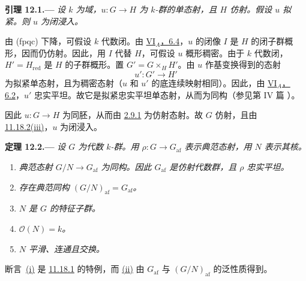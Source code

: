 \medskip
{}\label{lem:sga3-VIB-12.1}%
\noindent\textbf{引理 12.1.---}
\emph{设 \(k\) 为域，\(u:G\to H\) 为 \(k\)-群的单态射，且 \(H\) 仿射。假设 \(u\) 拟紧。则 \(u\) 为闭浸入。}

由 \textup{(fpqc)} 下降，可假设 \(k\) 代数闭。由 \hyperref[prop:sga3-VIA-6.4]{VI\(_A\)，6.4}，\(u\) 的闭像 \(I\) 是 \(H\) 的闭子群概形，因而仍仿射。因此，用 \(I\) 代替 \(H\)，可假设 \(u\) 概形稠密。由于 \(k\) 代数闭，\(H'=H_{\mathrm{red}}\) 是 \(H\) 的子群概形。置 \(G'=G\times_HH'\)。由 \(u\) 作基变换得到的态射
\[
  u':G'\longrightarrow H'
\]
为拟紧单态射，且为稠密态射\textup{（\(u\) 和 \(u'\) 的底连续映射相同）}。因此，由 \hyperref[cor:sga3-VIA-6.2]{VI\(_A\)，6.2}，\(u'\) 忠实平坦。故它是拟紧忠实平坦单态射，从而为同构\textup{（参见第 IV 篇 ）}。

因此 \(u:G\to H\) 为同胚，从而由 \hyperref[lem:sga3-VIB-2.9.1]{2.9.1} 为仿射态射。故 \(G\) 仿射，且由 \hyperref[thm:sga3-VIB-11.18.2]{11.18.2\textup{(iii)}}，\(u\) 为闭浸入。

\medskip
{}\label{thm:sga3-VIB-12.2}%
\noindent\textbf{定理 12.2.---}
\emph{设 \(G\) 为代数 \(k\)-群。用 \(\rho:G\to G_{\mathrm{af}}\) 表示典范态射，用 \(N\) 表示其核。}
\begin{enumerate}
\item[\textup{(i)}]\label{thm:sga3-VIB-12.2-i}%
  \emph{典范态射 \(G/N\to G_{\mathrm{af}}\) 为同构。因此 \(G_{\mathrm{af}}\) 是仿射代数群，且 \(\rho\) 忠实平坦。}

\item[\textup{(ii)}]\label{thm:sga3-VIB-12.2-ii}%
  \emph{存在典范同构 \((G/N)_{\mathrm{af}}=G_{\mathrm{af}}\)。}

\item[\textup{(iii)}]\label{thm:sga3-VIB-12.2-iii}%
  \emph{\(N\) 是 \(G\) 的特征子群。}

\item[\textup{(iv)}]\label{thm:sga3-VIB-12.2-iv}%
  \emph{\(\mathcal O(N)=k\)。}

\item[\textup{(v)}]\label{thm:sga3-VIB-12.2-v}%
  \emph{\(N\) 平滑、连通且交换。}
\end{enumerate}

断言~\hyperref[thm:sga3-VIB-12.2-i]{\textup{(i)}} 是 \hyperref[lem:sga3-VIB-11.18.1]{11.18.1} 的特例，而 \hyperref[thm:sga3-VIB-12.2-ii]{\textup{(ii)}} 由 \(G_{\mathrm{af}}\) 与 \((G/N)_{\mathrm{af}}\) 的泛性质得到。

